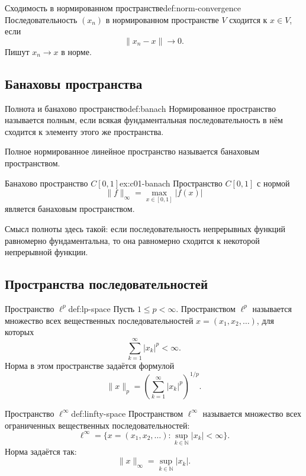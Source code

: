 \begin{Definition}{Сходимость в нормированном пространстве}{def:norm-convergence}
	Последовательность \((x_n)\) в нормированном пространстве \(V\) сходится к \(x\in V\), если
	\[
	\|x_n-x\|\to 0.
	\]
	Пишут \(x_n\to x\) в норме.
\end{Definition}

\subsection{Банаховы пространства}

\begin{Definition}{Полнота и банахово пространство}{def:banach}
	Нормированное пространство называется полным, если всякая фундаментальная последовательность в нём сходится к элементу этого же пространства.
	
	Полное нормированное линейное пространство называется банаховым пространством.
\end{Definition}

\begin{Example}{Банахово пространство \(C[0,1]\)}{ex:c01-banach}
	Пространство \(C[0,1]\) с нормой
	\[
	\|f\|_{\infty}=\max_{x\in[0,1]}|f(x)|
	\]
	является банаховым пространством.
	
	Смысл полноты здесь такой: если последовательность непрерывных функций равномерно фундаментальна, то она равномерно сходится к некоторой непрерывной функции.
\end{Example}

\subsection{Пространства последовательностей}

\begin{Definition}{Пространство \(\ell^p\)}{def:lp-space}
	Пусть \(1\le p<\infty\). Пространством \(\ell^p\) называется множество всех вещественных последовательностей \(x=(x_1,x_2,\dots)\), для которых
	\[
	\sum_{k=1}^{\infty}|x_k|^p<\infty.
	\]
	Норма в этом пространстве задаётся формулой
	\[
	\|x\|_p=
	\left(\sum_{k=1}^{\infty}|x_k|^p\right)^{1/p}.
	\]
\end{Definition}

\begin{Definition}{Пространство \(\ell^{\infty}\)}{def:linfty-space}
	Пространством \(\ell^{\infty}\) называется множество всех ограниченных вещественных последовательностей:
	\[
	\ell^{\infty}
	=
	\{x=(x_1,x_2,\dots):\sup_{k\in\mathbb N}|x_k|<\infty\}.
	\]
	Норма задаётся так:
	\[
	\|x\|_{\infty}
	=
	\sup_{k\in\mathbb N}|x_k|.
	\]
\end{Definition}

